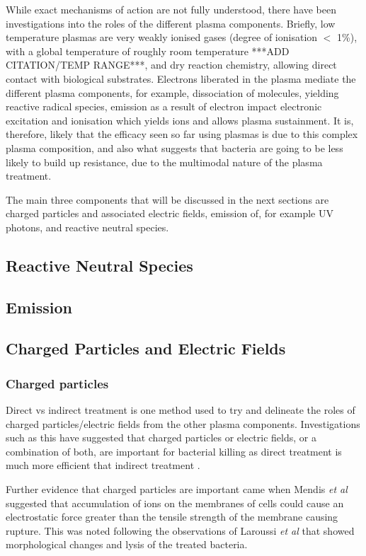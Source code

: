 \documentclass[11pt, oneside]{article}   	%
\begin{document}
While exact mechanisms of action are not fully understood, there have been investigations into the roles of the different plasma components.
Briefly, low temperature plasmas are very weakly ionised gases (degree of ionisation $<$ 1\%), with a global temperature of roughly room temperature ***ADD CITATION/TEMP RANGE***, and dry reaction chemistry, allowing direct contact with biological substrates.
Electrons liberated in the plasma mediate the different plasma components, for example, dissociation of molecules, yielding reactive radical species, emission as a result of electron impact electronic excitation and ionisation which yields ions and allows plasma sustainment.
It is, therefore, likely that the efficacy seen so far using plasmas is due to this complex plasma composition, and also what suggests that bacteria are going to be less likely to build up resistance, due to the multimodal nature of the plasma treatment.

The main three components that will be discussed in the next sections are charged particles and associated electric fields, emission of, for example UV photons, and reactive neutral species.

\subsection{Reactive Neutral Species}


\subsection{Emission}

\subsection{Charged Particles and Electric Fields}
\subsubsection{Charged particles}
Direct vs indirect treatment is one method used to try and delineate the roles of charged particles/electric fields from the other plasma components.
Investigations such as this have suggested that charged particles or electric fields, or a combination of both, are important for bacterial killing as direct treatment is much more efficient that indirect treatment \cite{Fridman2007comparison}.

Further evidence that charged particles are important came when Mendis \textit{et al} \cite{Mendis2000a} suggested that accumulation of ions on the membranes of cells could cause an electrostatic force greater than the tensile strength of the membrane causing rupture.
This was noted following the observations of Laroussi \textit{et al} \cite{Laroussi1999images} that showed morphological changes and lysis of the treated bacteria.
\end{document}
